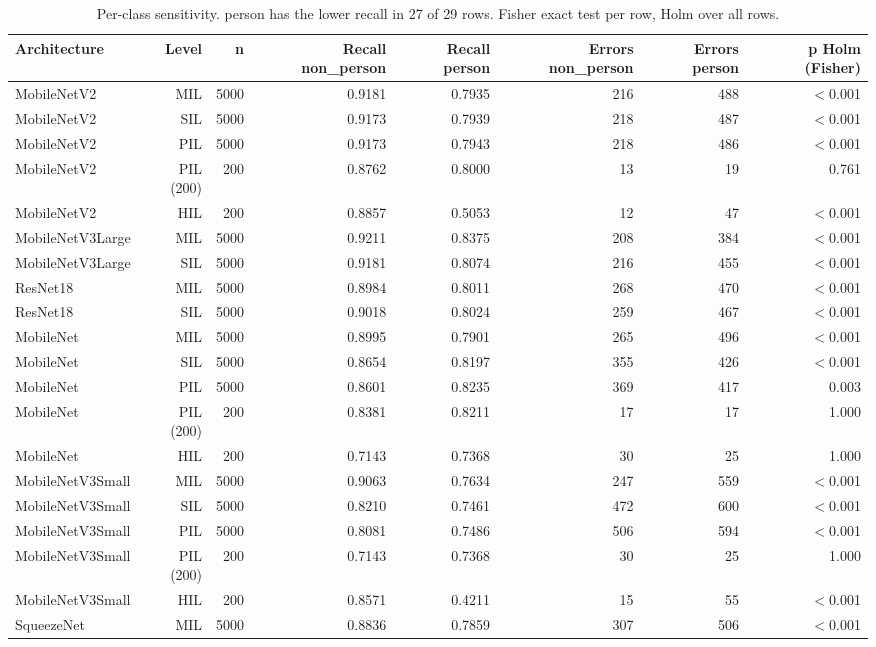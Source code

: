 \begin{table}[htbp]
\centering
\scriptsize
\caption{Per-class sensitivity. person has the lower recall in 27 of 29 rows. Fisher exact test per row, Holm over all rows.}
\label{tab:ladder-coco-5}
\begin{tabular}{lrrrrrrr}
\toprule
Architecture & Level & n & Recall non\_person & Recall person & Errors non\_person & Errors person & p Holm (Fisher) \\
\midrule
MobileNetV2 & MIL & 5000 & 0.9181 & 0.7935 & 216 & 488 & $<$0.001 \\
MobileNetV2 & SIL & 5000 & 0.9173 & 0.7939 & 218 & 487 & $<$0.001 \\
MobileNetV2 & PIL & 5000 & 0.9173 & 0.7943 & 218 & 486 & $<$0.001 \\
MobileNetV2 & PIL (200) & 200 & 0.8762 & 0.8000 & 13 & 19 & 0.761 \\
MobileNetV2 & HIL & 200 & 0.8857 & 0.5053 & 12 & 47 & $<$0.001 \\
MobileNetV3Large & MIL & 5000 & 0.9211 & 0.8375 & 208 & 384 & $<$0.001 \\
MobileNetV3Large & SIL & 5000 & 0.9181 & 0.8074 & 216 & 455 & $<$0.001 \\
ResNet18 & MIL & 5000 & 0.8984 & 0.8011 & 268 & 470 & $<$0.001 \\
ResNet18 & SIL & 5000 & 0.9018 & 0.8024 & 259 & 467 & $<$0.001 \\
MobileNet & MIL & 5000 & 0.8995 & 0.7901 & 265 & 496 & $<$0.001 \\
MobileNet & SIL & 5000 & 0.8654 & 0.8197 & 355 & 426 & $<$0.001 \\
MobileNet & PIL & 5000 & 0.8601 & 0.8235 & 369 & 417 & 0.003 \\
MobileNet & PIL (200) & 200 & 0.8381 & 0.8211 & 17 & 17 & 1.000 \\
MobileNet & HIL & 200 & 0.7143 & 0.7368 & 30 & 25 & 1.000 \\
MobileNetV3Small & MIL & 5000 & 0.9063 & 0.7634 & 247 & 559 & $<$0.001 \\
MobileNetV3Small & SIL & 5000 & 0.8210 & 0.7461 & 472 & 600 & $<$0.001 \\
MobileNetV3Small & PIL & 5000 & 0.8081 & 0.7486 & 506 & 594 & $<$0.001 \\
MobileNetV3Small & PIL (200) & 200 & 0.7143 & 0.7368 & 30 & 25 & 1.000 \\
MobileNetV3Small & HIL & 200 & 0.8571 & 0.4211 & 15 & 55 & $<$0.001 \\
SqueezeNet & MIL & 5000 & 0.8836 & 0.7859 & 307 & 506 & $<$0.001 \\

\end{tabular}
\end{table}
